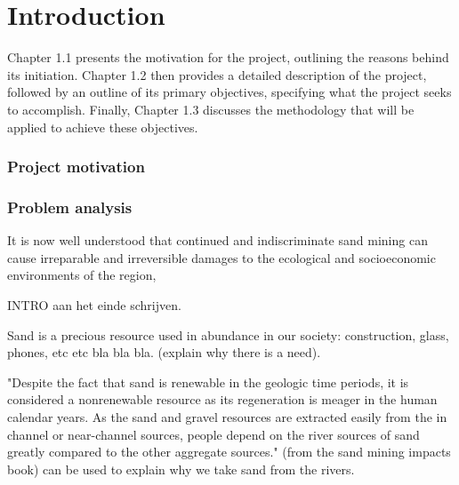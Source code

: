 \chapter{Introduction}
\label{chapter:introduction}

Chapter 1.1 presents the motivation for the project, outlining the reasons behind its initiation. Chapter 1.2 then provides a detailed description of the project, followed by an outline of its primary objectives, specifying what the project seeks to accomplish. Finally, Chapter 1.3 discusses the methodology that will be applied to achieve these objectives.

\subsection{Project motivation}


\subsection{Problem analysis}

























It is now well understood that continued and indiscriminate sand mining can cause irreparable and irreversible damages to the ecological and socioeconomic environments of the region,

INTRO aan het einde schrijven.

Sand is a precious resource used in abundance in our society: construction, glass, phones, etc etc bla bla bla. (explain why there is a need).


"Despite the fact that sand is renewable in the geologic time periods, it is considered a nonrenewable resource as its regeneration is meager in the human calendar years. As the sand and gravel resources are extracted easily from the in channel or near-channel sources, people depend on the river sources of sand greatly compared to the other aggregate sources."
(from the sand mining impacts book)
can be used to explain why we take sand from the rivers.

